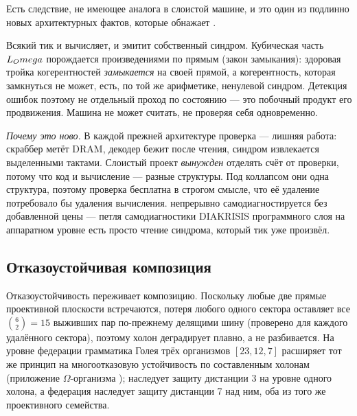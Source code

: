 Есть следствие, не имеющее аналога в слоистой машине, и это один из подлинно
новых архитектурных фактов, которые обнажает \TALOS{}.

\begin{principle}\label{prin:selfdiag}
Всякий тик и вычисляет, и эмитит собственный синдром. Кубическая часть
$L_Omega$ порождается произведениями по прямым (закон замыкания): здоровая
тройка когерентностей \emph{замыкается} на своей прямой, а когерентность,
которая замкнуться не может, есть, по той же арифметике, ненулевой синдром.
Детекция ошибок поэтому не отдельный проход по состоянию --- это побочный
продукт его продвижения. Машина не может считать, не проверяя себя
одновременно.
\end{principle}

\noindent\emph{Почему это ново.} В каждой прежней архитектуре проверка --- лишняя
работа: скраббер метёт DRAM, декодер бежит после чтения, синдром извлекается
выделенными тактами. Слоистый проект \emph{вынужден} отделять счёт от проверки,
потому что код и вычисление --- разные структуры. Под коллапсом они одна
структура, поэтому проверка бесплатна в строгом смысле, что её удаление
потребовало бы удаления вычисления. \TALOS{} непрерывно самодиагностируется без
добавленной цены --- петля самодиагностики DIAKRISIS программного слоя \SYNARC{}
на аппаратном уровне есть просто чтение синдрома, который тик уже произвёл.

\subsection{Отказоустойчивая композиция}

Отказоустойчивость переживает композицию. Поскольку любые две прямые
проективной плоскости встречаются, потеря любого одного сектора оставляет все
$\binom{6}{2}=15$ выживших пар по-прежнему делящими шину (проверено для каждого
удалённого сектора), поэтому холон деградирует плавно, а не разбивается. На
уровне федерации грамматика Голея трёх организмов $[23,12,7]$ расширяет тот же
принцип на многоотказовую устойчивость по составленным холонам (приложение
$\Omega$-организма \SYNARC{}); \TALOS{} наследует защиту дистанции 3 на уровне
одного холона, а федерация наследует защиту дистанции 7 над ним, оба из того же
проективного семейства.

